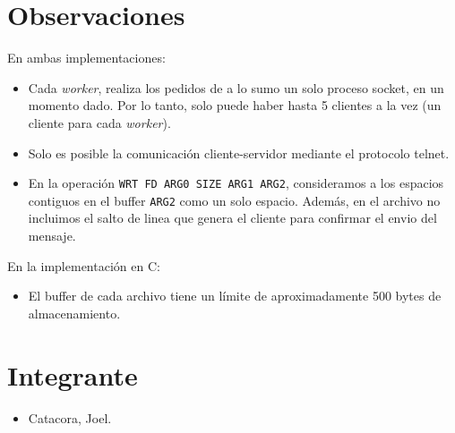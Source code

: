\documentclass[a4paper, 8pt]{article}
\begin{document}
\section{Observaciones}

En ambas implementaciones:

\begin{itemize}

% 
  \item Cada \textit{worker}, realiza los pedidos de a lo sumo un solo proceso socket, en un momento dado. Por lo tanto, solo puede haber
  hasta 5 clientes a la vez (un cliente para cada \textit{worker}).

  \item Solo es posible la comunicación cliente-servidor mediante el protocolo telnet.
  
  \item En la operación \texttt{WRT FD ARG0 SIZE ARG1 ARG2}, consideramos a los espacios contiguos en el buffer \texttt{ARG2}
  como un solo espacio. Además, en el archivo no incluimos el salto de linea que genera el cliente para confirmar el envio del mensaje.
  
\end{itemize}

En la implementación en C:

\begin{itemize}
  \item El buffer de cada archivo tiene un límite de aproximadamente 500 bytes de almacenamiento.
  
\end{itemize}

\section{Integrante}
\begin{itemize}
  \item Catacora, Joel.
\end{itemize}
\end{document}
